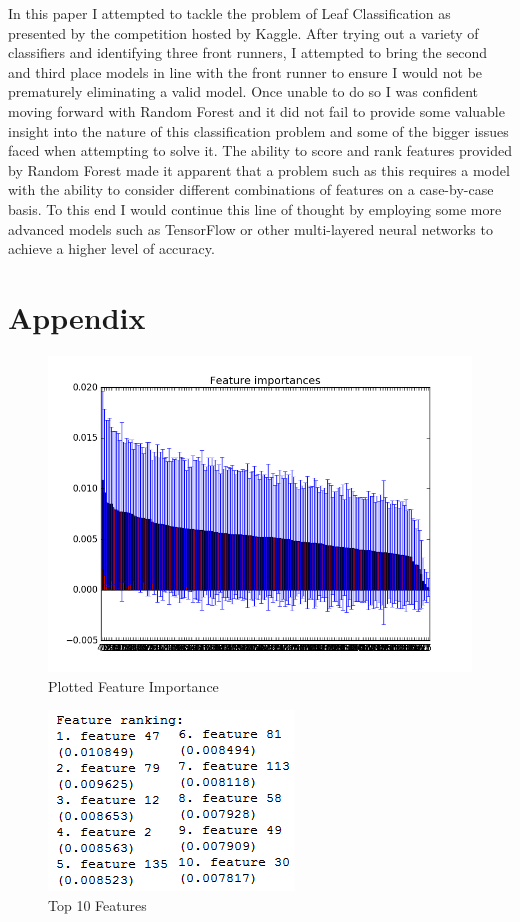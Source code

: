 \documentclass[12pt]{article}
\begin{document}
In this paper I attempted to tackle the problem of Leaf Classification as presented by the competition hosted by Kaggle. After trying out a variety of classifiers and identifying three front runners, I attempted to bring the second and third place models in line with the front runner to ensure I would not be prematurely eliminating a valid model. Once unable to do so I was confident moving forward with Random Forest and it did not fail to provide some valuable insight into the nature of this classification problem and some of the bigger issues faced when attempting to solve it. The ability to score and rank features provided by Random Forest made it apparent that a problem such as this requires a model with the ability to consider different combinations of features on a case-by-case basis. To this end I would continue this line of thought by employing some more advanced models such as TensorFlow or other multi-layered neural networks to achieve a higher level of accuracy.

\clearpage

\section{Appendix}

\begin{figure}[H]
    \includegraphics[scale=0.9]{featureImportance.png}
    \caption{Plotted Feature Importance}
\end{figure}

\begin{figure}[H]
    \centering
    \includegraphics{FeatureRanking.png}
    \caption{Top 10 Features}
\end{figure}
\end{document}
